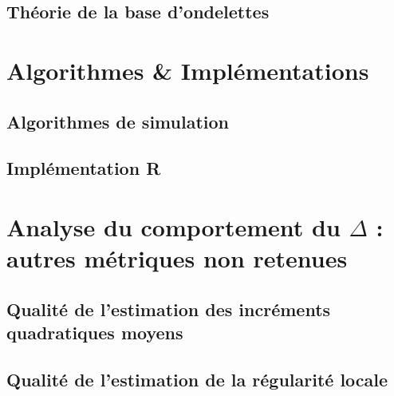 \section{Théorie de la base d'ondelettes}
\label{annexe:wavelet}

\pagebreak

% 

\chapter{Algorithmes \& Implémentations}

\label{annexe:code}
\section{Algorithmes de simulation}



\pagebreak

\section{Implémentation R}




\chapter{
  Analyse du comportement du $\Delta$ : autres métriques non retenues
 }

\section{Qualité de l'estimation des incréments quadratiques moyens}


\section{Qualité de l'estimation de la régularité locale}

